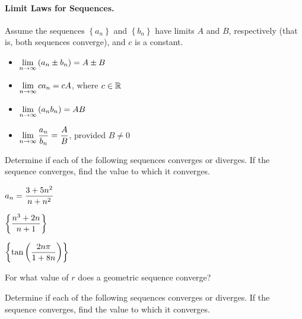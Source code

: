 \documentclass[12pt]{article}
\begin{document}
\paragraph{Limit Laws for Sequences.} Assume the sequences $\left\{ a_n\right\}$ and $\left\{ b_n \right\}$ have limits $A$ and $B$, respectively (that is, both sequences converge), and $c$ is a constant.

\vspace{2mm}
 
\begin{itemize}
	\item[\tc{1}] $\displaystyle\lim_{n\to\infty}\left(a_n\pm b_n\right)=A\pm B$ 
	\item[\tc{2}] $\displaystyle\lim_{n\to\infty}c a_n=cA$, where $c\in\mathbb{R}$
	\item[\tc{3}] $\displaystyle\lim_{n\to\infty}\left(a_n b_n\right)=AB$
	\item[\tc{4}] $\displaystyle\lim_{n\to\infty}\frac{a_n}{b_n}=\frac{A}{B}$, provided $B\neq 0$
\end{itemize}

\newpage

\Examples Determine if each of the following sequences converges or diverges. If the sequence converges, find the value to which it converges.

\vspace{5mm}

$\displaystyle a_n=\frac{3+5n^2}{n+n^2}$

\vfill

$\displaystyle\left\{\frac{n^3+2n}{n+1}\right\}$

\vfill

$\displaystyle\left\{\tan\left(\frac{2n\pi}{1+8n}\right)\right\}$

\vfill


\vspace{3mm}

For what value of $r$ does a geometric sequence converge?

\vfill
\vfill

\newpage
{}

\Examples Determine if each of the following sequences converges or diverges. If the sequence converges, find the value to which it converges.
\end{document}
